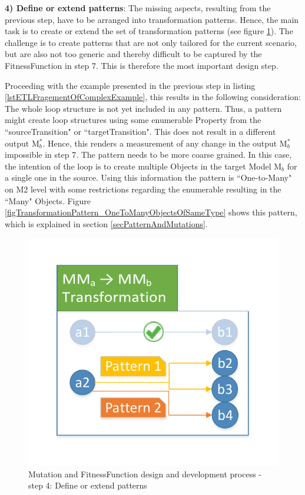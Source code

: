 \textbf{4) Define or extend patterns}: The missing aspects, resulting from the previous step, have to be arranged into transformation patterns. Hence, the main task is to create or extend the set of transformation patterns (see figure \ref{figMutationAndFitnessFunctionDesignProcess-Step4}). The challenge is to create patterns that are not only tailored for the current scenario, but are also not too generic and thereby difficult to be captured by the \gls{FitnessFunction} in step 7. This is therefore the most important design step. 

Proceeding with the example presented in the previous step in listing \ref{lstETLFragementOfComplexExample}, this results in the following consideration: The whole loop structure is not yet included in any pattern. Thus, a pattern might create loop structures using some enumerable \gls{Property} from the ``sourceTransition" or ``targetTransition". This does not result in a different output M$_b^*$. Hence, this renders a measurement of any change in the output M$_b^*$ impossible in step 7. The pattern needs to be more coarse grained. In this case, the intention of the loop is to create multiple \glspl{Object} in the target \gls{Model} M$_b$ for a single one in the source. Using this information the pattern is ``One-to-Many" on M2 level with some restrictions regarding the enumerable resulting in the ``Many" \glspl{Object}. Figure \ref{figTransformationPattern_OneToManyObjectsOfSameType} shows this pattern, which is explained in section \ref{secPatternAndMutations}.

\begin{figure}[!ht]
	\centering
	\includegraphics[scale=0.5, trim=0cm 1cm 0cm 1cm, clip=true]{Images/MutationAndFitnessFunctionDesignProcess-Step4.pdf} 
	\caption{\Gls{Mutation} and \gls{FitnessFunction} design and development process - step 4: Define or extend patterns}
	\label{figMutationAndFitnessFunctionDesignProcess-Step4}
\end{figure}


